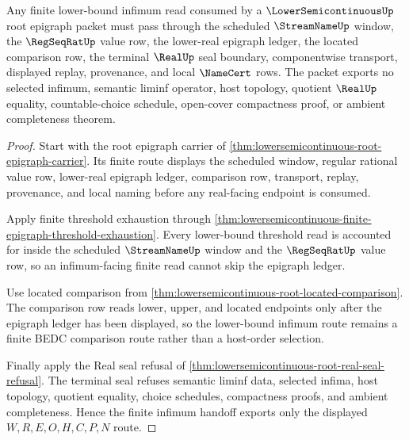 \begin{theorem}
\label{thm:lowersemicontinuous-root-epigraph-finite-infimum-handoff}
Any finite lower-bound infimum read consumed by a $\LowerSemicontinuousUp$ root epigraph packet must pass through the scheduled $\StreamNameUp$ window, the $\RegSeqRatUp$ value row, the lower-real epigraph ledger, the located comparison row, the terminal $\RealUp$ seal boundary, componentwise transport, displayed replay, provenance, and local $\NameCert$ rows. The packet exports no selected infimum, semantic liminf operator, host topology, quotient $\RealUp$ equality, countable-choice schedule, open-cover compactness proof, or ambient completeness theorem.
\end{theorem}
\begin{proof}
Start with the root epigraph carrier of \autoref{thm:lowersemicontinuous-root-epigraph-carrier}. Its finite route displays the scheduled window, regular rational value row, lower-real epigraph ledger, comparison row, transport, replay, provenance, and local naming before any real-facing endpoint is consumed.

Apply finite threshold exhaustion through \autoref{thm:lowersemicontinuous-finite-epigraph-threshold-exhaustion}. Every lower-bound threshold read is accounted for inside the scheduled $\StreamNameUp$ window and the $\RegSeqRatUp$ value row, so an infimum-facing finite read cannot skip the epigraph ledger.

Use located comparison from \autoref{thm:lowersemicontinuous-root-located-comparison}. The comparison row reads lower, upper, and located endpoints only after the epigraph ledger has been displayed, so the lower-bound infimum route remains a finite BEDC comparison route rather than a host-order selection.

Finally apply the Real seal refusal of \autoref{thm:lowersemicontinuous-root-real-seal-refusal}. The terminal seal refuses semantic liminf data, selected infima, host topology, quotient equality, choice schedules, compactness proofs, and ambient completeness. Hence the finite infimum handoff exports only the displayed $W,R,E,O,H,C,P,N$ route.
\end{proof}

